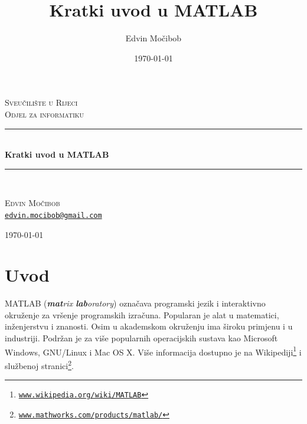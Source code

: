 \documentclass[a4paper, 10pt]{article}
\title{Kratki uvod u MATLAB}
\author{Edvin Močibob}
\date{\today}
\newcommand{\eng}[1]{\emph{#1}} %
\begin{document}

\begin{titlepage}
\newcommand{\HRule}{\rule{\linewidth}{0.5mm}}
\begin{center}

\textsc{\LARGE Sveučilište u Rijeci}\\[0.5cm]
\textsc{\Large Odjel za informatiku}\\[2.5cm]

\HRule \\[0.4cm]
{\huge \bfseries Kratki uvod u MATLAB}\\[0.1cm]

\HRule \\[1.5cm]

\begin{minipage}{0.5\textwidth}
	\begin{center}
		\large
		\textsc{\Large Edvin Močibob}\\[0.1cm]
		\texttt{\href{mailto:edvin.mocibob@gmail.com}{edvin.mocibob@gmail.com}}
	\end{center}
\end{minipage}

\vfill
{\large \today}
\end{center}
\end{titlepage}


\tableofcontents
\clearpage


\section*{Uvod}

MATLAB (\eng{\textbf{mat}rix \textbf{lab}oratory}) označava programski jezik i interaktivno okruženje za vršenje programskih izračuna.
Popularan je alat u matematici, inženjerstvu i znanosti.
Osim u akademskom okruženju ima široku primjenu i u industriji.
Podržan je za više popularnih operacijskih sustava kao Microsoft Windows, GNU/Linux i Mac OS X.
Više informacija dostupno je na Wikipediji\footnote{\texttt{\href{https://en.wikipedia.org/wiki/MATLAB}{www.wikipedia.org/wiki/MATLAB}}} i službenoj stranici\footnote{\texttt{\href{http://www.mathworks.com/products/matlab/}{www.mathworks.com/products/matlab/}}}.
\end{document}
